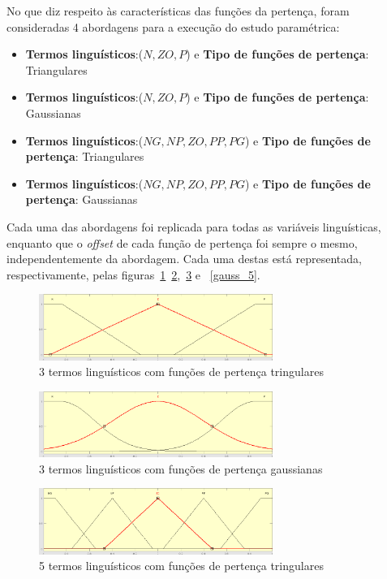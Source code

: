 \documentclass{article}
\begin{document}
No que diz respeito às características das funções da pertença, foram consideradas 4 abordagens para a execução do estudo paramétrica:
\begin{itemize}
\item \textbf{Termos linguísticos}:(${N,ZO,P}$) e \textbf{Tipo de funções de pertença}: Triangulares
\item \textbf{Termos linguísticos}:(${N,ZO,P}$) e \textbf{Tipo de funções de pertença}: Gaussianas
\item \textbf{Termos linguísticos}:(${NG,NP,ZO,PP,PG}$) e \textbf{Tipo de funções de pertença}: Triangulares
\item \textbf{Termos linguísticos}:(${NG,NP,ZO,PP,PG}$) e \textbf{Tipo de funções de pertença}: Gaussianas
\end{itemize}

Cada uma das abordagens foi replicada para todas as variáveis linguísticas, enquanto que o \textit{offset} de cada função de pertença foi sempre o mesmo, independentemente da abordagem.
Cada uma destas está representada, respectivamente, pelas figuras~\ref{trimf_3}~\ref{gauss_3},~\ref{trimf_5} e ~\ref{gauss_5}.

\begin{figure}[!h]
  \centering
  \includegraphics[width=3in]{figures/trimf3}
  \caption{3 termos linguísticos com funções de pertença tringulares}
  \label{trimf_3}
\end{figure}

\begin{figure}[!h]
  \centering
  \includegraphics[width=3in]{figures/gauss3}
  \caption{3 termos linguísticos com funções de pertença gaussianas}
  \label{gauss_3}
\end{figure}

\begin{figure}[!h]
  \centering
  \includegraphics[width=3in]{figures/trimf5}
  \caption{5 termos linguísticos com funções de pertença tringulares}
  \label{trimf_5}
\end{figure}
\end{document}
